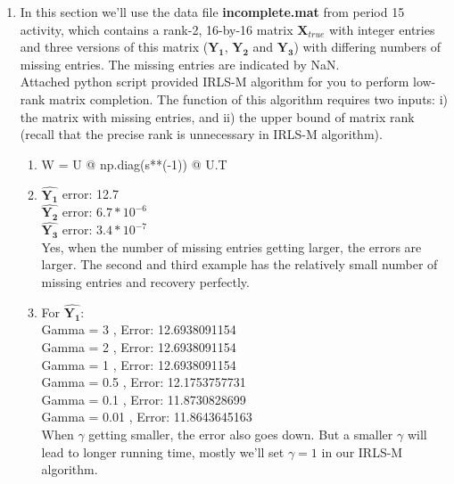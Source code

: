 \documentclass[12pt]{article}
\def \bX{\boldsymbol{X}}
\begin{document}
\begin{enumerate}
    \item In this section we'll use the data file \textbf{incomplete.mat} from period 15 activity, which contains a rank-2, 16-by-16 matrix $\bX_{true}$ with integer entries and three versions of this matrix ($\boldsymbol{Y_1}$, $\boldsymbol{Y_2}$ and $\boldsymbol{Y_3}$) with differing numbers of missing entries. The missing entries are indicated by NaN.\\
    Attached python script provided IRLS-M algorithm for you to perform low-rank matrix completion. The function of this algorithm requires two inputs: i) the matrix with missing entries, and ii) the upper bound of matrix rank (recall that the precise rank is unnecessary in IRLS-M algorithm).
    \begin{enumerate}
    \item 
    \begin{python}
    W = U @ np.diag(s**(-1)) @ U.T
    \end{python}
    \item 
    $\boldsymbol{\hat{Y_1}}$ error: 12.7\\
    $\boldsymbol{\hat{Y_2}}$ error: $6.7 * 10^{-6}$\\
    $\boldsymbol{\hat{Y_3}}$ error: $3.4 * 10^{-7}$\\
    Yes, when the number of missing entries getting larger, the errors are larger. The second and third example has the relatively small number of missing entries and recovery perfectly.
    \item For $\boldsymbol{\hat{Y_1}}$:\\
    Gamma = 3 , Error: 12.6938091154\\
    Gamma = 2 , Error: 12.6938091154\\
    Gamma = 1 , Error: 12.6938091154\\
    Gamma = 0.5 , Error: 12.1753757731\\
    Gamma = 0.1 , Error: 11.8730828699\\
    Gamma = 0.01 , Error: 11.8643645163\\
    When $\gamma$ getting smaller, the error also goes down. But a smaller $\gamma$ will lead to longer running time, mostly we'll set $\gamma = 1$ in our IRLS-M algorithm.
    \end{enumerate}
    

\end{enumerate}
\end{document}
